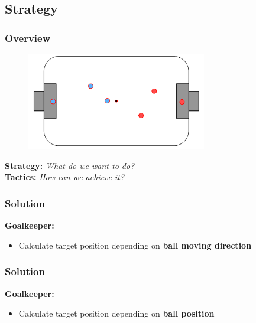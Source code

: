 \documentclass[hyperref={pdfpagelabels=false},compress]{beamer}
\begin{document}
\subsection{Strategy}
\begin{frame}
    \frametitle{Overview}
    \begin{figure}
        \includegraphics[width=0.7\textwidth]{Pictures/strategy}
    \end{figure}
    \textbf{Strategy:} \textit{What do we want to do?}\\
    \textbf{Tactics:} \textit{How can we achieve it?}
\end{frame}

\begin{frame}
		\frametitle{Solution}
		\textbf{Goalkeeper:}\\
		\begin{itemize}
				\item Calculate target position depending on \textbf{ball moving direction}\\
		\end{itemize}
		\begin{center}
				
		\end{center}
\end{frame}

\begin{frame}
    \frametitle{Solution}
    \textbf{Goalkeeper:}\\
    \begin{itemize}
        \item Calculate target position depending on \textbf{ball position}\\
    \end{itemize}
    \begin{center}
        
    \end{center}
\end{frame}

%        
\end{document}

